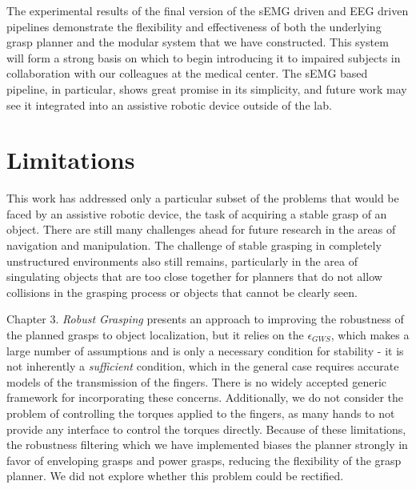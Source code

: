 The experimental results of the final version of the sEMG driven and EEG driven pipelines demonstrate the flexibility and effectiveness of both the underlying grasp planner and the modular system that we have constructed. This system will form a strong basis on which to begin introducing it to impaired subjects in collaboration with our colleagues at the medical center. The sEMG based pipeline, in particular, shows great promise in its simplicity, and future work may see it integrated into an assistive robotic device outside of the lab.  

\section{Limitations}
This work has addressed only a particular subset of the problems that would be faced by an assistive robotic device, the task of acquiring a stable grasp of an object. There are still many challenges ahead for future research in the areas of navigation and manipulation. The challenge of stable grasping in completely unstructured environments also still remains, particularly in the area of singulating objects that are too close together for planners that do not allow collisions in the grasping process or objects that cannot be clearly seen. 

Chapter 3. \emph{Robust Grasping} presents an approach to improving the robustness of the planned grasps to object localization, but it relies on the $\epsilon_{GWS}$, which makes a large number of assumptions and is only a necessary condition for stability - it is not inherently a \emph{sufficient} condition, which in the general case requires accurate models of the transmission of the fingers. There is no widely accepted generic framework for incorporating these concerns. Additionally, we do not consider the problem of controlling the torques applied to the fingers, as many hands to not provide any interface to control the torques directly. Because of these limitations, the robustness filtering which we have implemented biases the planner strongly in favor of enveloping grasps and power grasps, reducing the flexibility of the grasp planner. We did not explore whether this problem could be rectified. 

